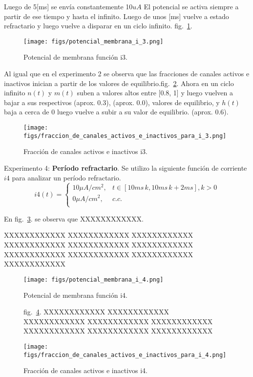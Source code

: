 \documentclass[aps,prl,twocolumn,groupedaddress]{revtex4-2}
\begin{document}
Luego de 5[ms] se envía constantemente 10$uA$
El potencial se activa siempre a partir de ese tiempo y hasta el infinito.
Luego de unos [ms] vuelve a estado refractario y luego vuelve a disparar en un ciclo infinito. fig.~\ref{fig5}.



\begin{figure}[h!]
\centering
\texttt{[image: figs/potencial\_membrana\_i\_3.png]}
\caption{Potencial de membrana función i3. \label{fig5}}
\end{figure}

Al igual que en el experimento 2 se observa que las fracciones de canales activos e inactivos inician a partir de los valores de equilibrio.fig.~\ref{fig6}.
Ahora en un ciclo infinito $n(t)$ y $m(t)$ suben a valores altos entre
[0.8, 1] y luego vuelven a bajar a sus respectivos (aprox. 0.3), (aprox. 0.0), valores de equilibrio,
y $h(t)$ baja a cerca de 0   luego vuelve a subir a su valor de equilibrio. (aprox. 0.6).



\begin{figure}[h!]
\centering
\texttt{[image: figs/fraccion\_de\_canales\_activos\_e\_inactivos\_para\_i\_3.png]}
\caption{Fracción de canales activos e inactivos i3. \label{fig6}}
\end{figure}


Experimento 4: \textbf{Período refractario}. Se utilizo la siguiente función de corriente $i4$ para analizar un período refractario.
$$
i4(t) = \left\{
\begin{array}{ll}
10 \mu A/cm^2, & t\in [10ms\, k,10 ms\, k + 2ms], k > 0\\
0 \mu A/cm^2, & c.c. \\
\end{array}
\right.
$$

En fig.~\ref{fig7}. se observa  que
XXXXXXXXXXXX.

XXXXXXXXXXXX
XXXXXXXXXXXX
XXXXXXXXXXXX
XXXXXXXXXXXX
XXXXXXXXXXXX
XXXXXXXXXXXX
XXXXXXXXXXXX
XXXXXXXXXXXX
XXXXXXXXXXXX
XXXXXXXXXXXX


\begin{figure}[h!]
\centering
\texttt{[image: figs/potencial\_membrana\_i\_4.png]}
\caption{Potencial de membrana función i4.\label{fig7}}
\end{figure}
\begin{figure}[h!]

fig.~\ref{fig8}.
XXXXXXXXXXXX
XXXXXXXXXXXX
XXXXXXXXXXXX
XXXXXXXXXXXX
XXXXXXXXXXXX
XXXXXXXXXXXX
XXXXXXXXXXXX
XXXXXXXXXXXX


\centering
\texttt{[image: figs/fraccion\_de\_canales\_activos\_e\_inactivos\_para\_i\_4.png]}
\caption{Fracción de canales activos e inactivos i4. \label{fig8}}
\end{figure}
\end{document}
